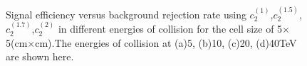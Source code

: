 \begin{figure}
\begin{center}

\end{center}
\caption{Signal efficiency versus background rejection rate using $c_2^{(1)}$,$c_2^{(1.5)}$,$c_2^{(1.7)}$,$c_2^{(2)}$ in different energies of collision for the cell size of  5$\times$5(cm$\times$cm).The energies of collision at (a)5, (b)10, (c)20, (d)40TeV are shown here.}
\label{cluster_r009_c_variable}
\end{figure}

